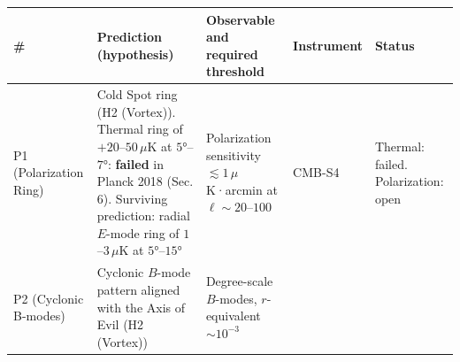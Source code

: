 \documentclass[
]{article}
\begin{document}
\begin{longtable}[]{@{}lllll@{}}
\toprule
\begin{minipage}[b]{0.11\columnwidth}\raggedright
\#\strut
\end{minipage} & \begin{minipage}[b]{0.19\columnwidth}\raggedright
Prediction (hypothesis)\strut
\end{minipage} & \begin{minipage}[b]{0.19\columnwidth}\raggedright
Observable and required threshold\strut
\end{minipage} & \begin{minipage}[b]{0.19\columnwidth}\raggedright
Instrument\strut
\end{minipage} & \begin{minipage}[b]{0.19\columnwidth}\raggedright
Status\strut
\end{minipage}\tabularnewline
\midrule
\endhead
\begin{minipage}[t]{0.11\columnwidth}\raggedright
P1 (Polarization Ring)\strut
\end{minipage} & \begin{minipage}[t]{0.19\columnwidth}\raggedright
Cold Spot ring (H2 (Vortex)). Thermal ring of \(+20\)--\(50\,\mu\)K at
\(5°\)--\(7°\): \textbf{failed} in Planck 2018 (Sec. 6). Surviving
prediction: radial \(E\)-mode ring of \(1\)--\(3\,\mu\)K at
\(5°\)--\(15°\)\strut
\end{minipage} & \begin{minipage}[t]{0.19\columnwidth}\raggedright
Polarization sensitivity \(\lesssim 1\,\mu\)K·arcmin at
\(\ell \sim 20\)--\(100\)\strut
\end{minipage} & \begin{minipage}[t]{0.19\columnwidth}\raggedright
CMB-S4\strut
\end{minipage} & \begin{minipage}[t]{0.19\columnwidth}\raggedright
Thermal: failed. Polarization: open\strut
\end{minipage}\tabularnewline
\begin{minipage}[t]{0.11\columnwidth}\raggedright
P2 (Cyclonic B-modes)\strut
\end{minipage} & \begin{minipage}[t]{0.19\columnwidth}\raggedright
Cyclonic \(B\)-mode pattern aligned with the Axis of Evil (H2
(Vortex))\strut
\end{minipage} & \begin{minipage}[t]{0.19\columnwidth}\raggedright
Degree-scale \(B\)-modes, \(r\)-equivalent \(\sim\!10^{-3}\)\strut

\end{minipage}
\end{longtable}
\end{document}
